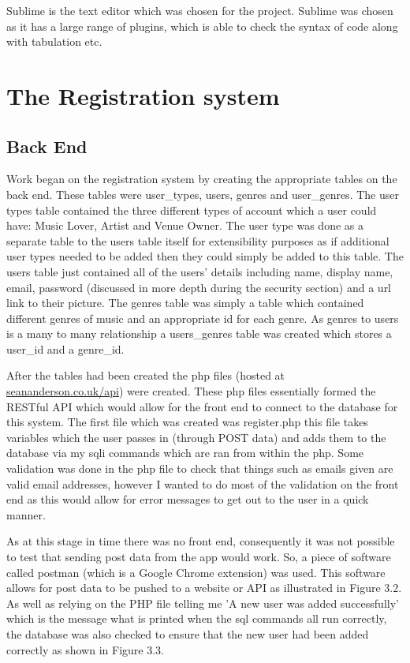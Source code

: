 Sublime is the text editor which was chosen for the project. Sublime was chosen as it has a large range of plugins, which is able to check the syntax of code along with tabulation etc.

\section{The Registration system}
\subsection{Back End}
Work began on the registration system by creating the appropriate tables on the back end. These tables were user\_types, users, genres and user\_genres. The user types table contained the three different types of account which a user could have: Music Lover, Artist and Venue Owner. The user type was done as a separate table to the users table itself for extensibility purposes as if additional user types needed to be added then they could simply be added to this table. The users table just contained all of the users' details including name, display name, email, password (discussed in more depth during the security section) and a url link to their picture. The genres table was simply a table which contained different genres of music and an appropriate id for each genre. As genres to users is a many to many relationship a users\_genres table was created which stores a user\_id and a genre\_id.

After the tables had been created the php files (hosted at \url{seananderson.co.uk/api}) were created. These php files essentially formed the RESTful API which would allow for the front end to connect to the database for this system. The first file which was created was register.php this file takes variables which the user passes in (through POST data) and adds them to the database via my sqli commands which are ran from within the php. Some validation was done in the php file to check that things such as emails given are valid email addresses, however I wanted to do most of the validation on the front end as this would allow for error messages to get out to the user in a quick manner. 

As at this stage in time there was no front end, consequently it was not possible to test that sending post data from the app would work. So, a piece of software called postman (which is a Google Chrome extension) was used. This software allows for post data to be pushed to a website or API as illustrated in Figure 3.2. As well as relying on the PHP file telling me 'A new user was added successfully' which is the message what is printed when the sql commands all run correctly, the database was also checked to ensure that the new user had been added correctly as shown in Figure 3.3.

